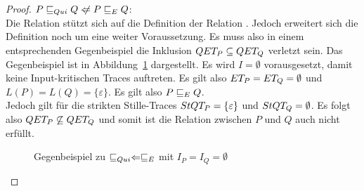 \begin{proof}
  $P \QRel Q \hspace{0.1cm}\not\hspace{-0.1cm}\Leftarrow P \ERel Q$:\\
  Die Relation \QRel{} stützt sich auf die Definition der Relation \ERel{}.
  Jedoch erweitert sich die Definition noch um eine weiter Voraussetzung. Es
  muss also in einem entsprechenden Gegenbeispiel die Inklusion $QET _P
  \subseteq QET _Q$ verletzt sein. Das Gegenbeispiel ist in
  Abbildung~\ref{QuiEGegenBsp} dargestellt. Es wird $I = \emptyset$
  vorausgesetzt, damit keine Input-kritischen Traces auftreten. Es gilt also
  $ET _P = ET _Q = \emptyset$ und $L(P) = L(Q) = \{\varepsilon\}$. Es gilt
  also $P \sqsubseteq  _E Q$.\\
  Jedoch gilt für die strikten Stille-Traces $StQT _P = \{\varepsilon\}$ und
  $StQT _Q = \emptyset$. Es folgt also $QET _P \not\subseteq QET _Q$ und
  somit ist die Relation \QRel{} zwischen $P$ und $Q$ auch nicht erfüllt.

  \begin{figure}[htbp]
    \begin{center}
      \caption{Gegenbeispiel zu $ \sqsubseteq  _{Qui} \Leftarrow  \sqsubseteq  _E$ mit $I_P = I_Q =
      \emptyset$}
      \label{QuiEGegenBsp}
    \end{center}
  \end{figure}
\end{proof}

